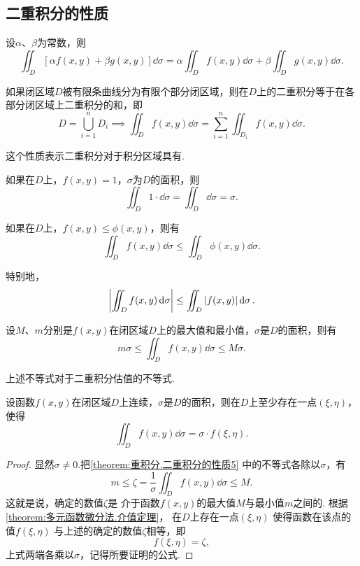 \subsection{二重积分的性质}
\begin{property}\label{theorem:重积分.二重积分的性质1}
设\(\alpha\)、\(\beta\)为常数，则\[
\iint_D [\alpha f(x,y)+\beta g(x,y)] \dd{\sigma}
=\alpha \iint_D f(x,y) \dd{\sigma}
+\beta \iint_D g(x,y) \dd{\sigma}.
\]
\end{property}

\begin{property}\label{theorem:重积分.二重积分的性质2}
如果闭区域\(D\)被有限条曲线分为有限个部分闭区域，则在\(D\)上的二重积分等于在各部分闭区域上二重积分的和，即\[
D = \bigcup_{i=1}^n D_i
\implies
\iint_D f(x,y) \dd{\sigma}
= \sum\limits_{i=1}^n \iint_{D_i} f(x,y) \dd{\sigma}.
\]
\end{property}
这个性质表示二重积分对于积分区域具有.

\begin{property}\label{theorem:重积分.二重积分的性质3}
如果在\(D\)上，\(f(x,y)=1\)，\(\sigma\)为\(D\)的面积，则\[
\iint_D 1\cdot\dd{\sigma}
=\iint_D \dd{\sigma}
=\sigma.
\]
\end{property}

\begin{property}\label{theorem:重积分.二重积分的性质4}
如果在\(D\)上，\(f(x,y) \leq \phi(x,y)\)，则有\[
\iint_D f(x,y) \dd{\sigma} \leq \iint_D \phi(x,y) \dd{\sigma}.
\]

特别地，\[
\abs{\iint_D f(x,y) \dd{\sigma}} \leq \iint_D \abs{f(x,y)} \dd{\sigma}.
\]
\end{property}

\begin{property}\label{theorem:重积分.二重积分的性质5}
设\(M\)、\(m\)分别是\(f(x,y)\)在闭区域\(D\)上的最大值和最小值，\(\sigma\)是\(D\)的面积，则有\[
m\sigma \leq \iint_D f(x,y) \dd{\sigma} \leq M\sigma.
\]
\end{property}
上述不等式对于二重积分估值的不等式.

\begin{property}[二重积分的中值定理]\label{theorem:重积分.二重积分的中值定理}
设函数\(f(x,y)\)在闭区域\(D\)上连续，\(\sigma\)是\(D\)的面积，则在\(D\)上至少存在一点\((\xi,\eta)\)，使得\[
\iint_D f(x,y) \dd{\sigma} = \sigma \cdot f(\xi,\eta).
\]
\begin{proof}
显然\(\sigma\neq0\).把\cref{theorem:重积分.二重积分的性质5} 中的不等式各除以\(\sigma\)，有\[
m
\leq
\zeta = \frac{1}{\sigma} \iint_D f(x,y) \dd{\sigma}
\leq
M.
\]
这就是说，确定的数值\(\zeta\)是%
介于函数\(f(x,y)\)的最大值\(M\)与最小值\(m\)之间的.
根据\cref{theorem:多元函数微分法.介值定理}，
在\(D\)上存在一点\((\xi,\eta)\)%
使得函数在该点的值\(f(\xi,\eta)\)%
与上述的确定的数值\(\zeta\)相等，即\[
f(\xi,\eta) = \zeta,
\]上式两端各乘以\(\sigma\)，记得所要证明的公式.
\end{proof}
\end{property}

